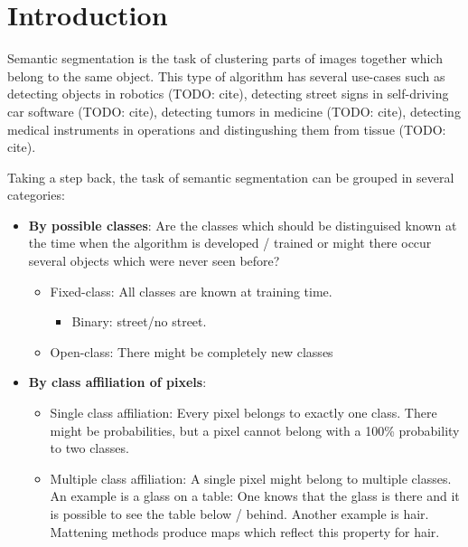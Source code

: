 \section{Introduction}\label{sec:introduction}
Semantic segmentation is the task of clustering parts of images together which
belong to the same object. This type of algorithm has several use-cases such as
detecting objects in robotics (TODO: cite), detecting street signs in
self-driving car software (TODO: cite), detecting tumors in medicine (TODO: cite),
detecting medical instruments in operations and distingushing them from
tissue (TODO: cite).

Taking a step back, the task of semantic segmentation can be grouped in several
categories:

\begin{itemize}
    \item \textbf{By possible classes}: Are the classes which should be distinguised
          known at the time when the algorithm is developed / trained or might
          there occur several objects which were never seen before?
          \begin{itemize}
              \item Fixed-class: All classes are known at training time.
              \begin{itemize}
                  \item Binary: street/no street.
              \end{itemize}
              \item Open-class: There might be completely new classes
          \end{itemize}
    \item \textbf{By class affiliation of pixels}:
        \begin{itemize}
            \item Single class affiliation: Every pixel belongs to exactly one class. There might
                  be probabilities, but a pixel cannot belong with a 100\%
                  probability to two classes.
            \item Multiple class affiliation: A single pixel might belong to
                  multiple classes. An example is a glass on a table: One
                  knows that the glass is there and it is possible to see the
                  table below / behind. Another example is hair. Mattening
                  methods produce maps which reflect this property for hair.\cite{levin2008spectral}

\end{itemize}
\end{itemize}
